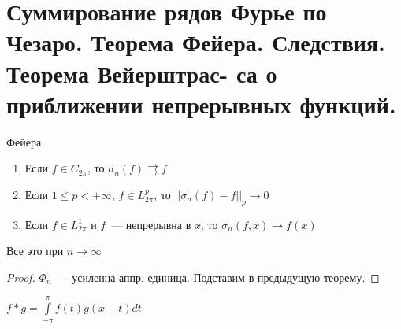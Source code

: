 \section{Суммирование рядов Фурье по Чезаро.
Теорема Фейера. Следствия. Теорема Вейерштрас-
са о приближении непрерывных функций.}

\begin{theorem}
	Фейера
	\begin{enumerate}
	\item Если $f \in C_{2\pi}$, то $\sigma_n(f) \rightrightarrows f$
	
	\item Если $1 \leqslant p < +\infty, \, f \in L_{2\pi}^p$, то $||\sigma_n(f) - f||_p \rightarrow 0$ 
	
	\item Если $f \in L_{2\pi}^1$ и $f$~--- непрерывна в $x$, то $\sigma_n(f, x) \rightarrow f(x)$
	\end{enumerate}
	Все это при $n \rightarrow \infty$
\end{theorem}

\begin{proof}
	$\Phi_n$~--- усиленна аппр. единица. Подставим в предыдущую теорему.
\end{proof}

\begin{observation}
	$f \ast g = \int\limits_{-\pi}^{\pi} f(t) g(x-t) dt$ 
\end{observation}

